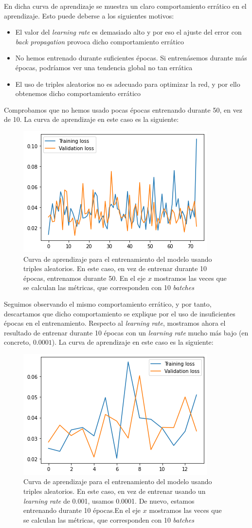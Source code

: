 \documentclass[11pt]{article}
\begin{document}
En dicha curva de aprendizaje se muestra un claro comportamiento errático en el aprendizaje. Esto puede deberse a los siguientes motivos:

\begin{itemize}
  \item El valor del \emph{learning rate} es demasiado alto y por eso el ajuste del error con \emph{back propagation} provoca dicho comportamiento errático
  \item No hemos entrenado durante suficientes épocas. Si entrenásemos durante más épocas, podríamos ver una tendencia global no tan errática
  \item El uso de triples aleatorios no es adecuado para optimizar la red, y por ello obtenemos dicho comportamiento errático
\end{itemize}

Comprobamos que no hemos usado pocas épocas entrenando durante 50, en vez de 10. La curva de aprendizaje en este caso es la siguiente:

\begin{figure}[H]
    \centering
    \includegraphics[width = 0.4 \textwidth]{random_curva_aprendizaje_larga}
    \caption{Curva de aprendizaje para el entrenamiento del modelo usando triples aleatorios. En este caso, en vez de entrenar durante 10 épocas, entrenamos durante 50. En el eje $x$ mostramos las veces que se calculan las métricas, que corresponden con 10 \emph{batches}}
\end{figure}

Seguimos observando el mismo comportamiento errático, y por tanto, descartamos que dicho comportamiento se explique por el uso de insuficientes épocas en el entrenamiento. Respecto al \emph{learning rate}, mostramos ahora el resultado de entrenar durante 10 épocas con un \emph{learning rate} mucho más bajo (en concreto, $0.0001$). La curva de aprendizaje en este caso es la siguiente:

\begin{figure}[H]
    \centering
    \includegraphics[width = 0.4 \textwidth]{random_curva_aprendizaje_lrbajo}
    \caption{Curva de aprendizaje para el entrenamiento del modelo usando triples aleatorios. En este caso, en vez de entrenar usando un \emph{learning rate} de 0.001, usamos 0.0001. De nuevo, estamos entrenando durante 10 épocas.En el eje $x$ mostramos las veces que se calculan las métricas, que corresponden con 10 \emph{batches}}
\end{figure}
\end{document}
